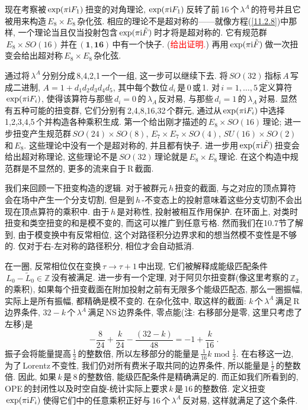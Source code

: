 现在考察被$\,\exp(\pi\mathrm{i} F_{1})\,$扭变的对角理论, $\exp(\pi\mathrm{i} F_{1})\,$反转了前\,16\,个$\,\lambda^{A}\,$的符号并且它被用来构造$\,E_{8}\times E_{8}\,$杂化弦. 相应的理论不是超对称的------就像方程(\ref{11.2.8})中那样, 一个理论当且仅当投射包含$\,\exp(\pi\mathrm{i} \tilde{F})\,$时才将是超对称的. 它有规范群$\,E_{8}\times SO(16)\,$并在$\,(\mathbf{1},\mathbf{16})\,$中有一个快子. (\textcolor{red}{给出证明.}) 再用$\,\exp(\pi\mathrm{i}\tilde{F})\,$做一次扭变会给出超对称$\,E_{8}\times E_{8}\,$杂化弦.

通过将$\,\lambda^{A}\,$分别分成\,8,4,2,1\,一个一组, 这一步可以继续下去. 将$\,SO(32)\,$指标$\,A\,$写成二进制, $A=1+d_{1}d_{2}d_{3}d_{4}d_{5}$, 其中每个数位$\,d_{i}\,$是\,0\,或\,1. 对$\,i=1,\ldots,5\,$定义算符$\,\exp(\pi\mathrm{i} F_{i})$, 使得该算符与那些$\,d_{i}=0\,$的$\,\lambda_{A}\,$反对易, 与那些$\,d_{i}=1\,$的$\,\lambda_{A}\,$对易. 显然有五种可能的扭变群, 它们分别有\,2,4,8,16,32\,个群元, 通过从$\,\exp(\pi\mathrm{i} F_{i})\,$中选择\,1,2,3,4,5\,个并构造各种乘积生成. 第一个给出刚才描述的$\,E_{8}\times SO(16)\,$理论; 进一步扭变产生规范群$\,SO(24)\times SO(8)$, $E_{7}\times E_{7}\times SO(4)$, $SU(16)\times SO(2)\,$和$\,E_{8}$. 这些理论中没有一个是超对称的, 并且都有快子. 进一步用$\,\exp(\pi\mathrm{i}\tilde{F})\,$扭变会给出超对称理论, 这些理论不是$\,SO(32)\,$理论就是$\,E_{8}\times E_{8}\,$理论. 在这个构造中规范群是不显然的, 更多的流来自于\,R\,截面.

我们来回顾一下扭变构造的逻辑. 对于被群元$\,h\,$扭变的截面, 与之对应的顶点算符会在场中产生一个分支切割, 但是到$\,h\,$-不变态上的投射意味着这些分支切割不会出现在顶点算符的乘积中. 由于$\,h\,$是对称性, 投射被相互作用保护. 在环面上, 对类时扭变和类空扭变的和是模不变的, 而这可以推广到任意亏格. 然而我们在10.7节了解到, 由于模变换中有反常相位,  这个对路径积分边界求和的想当然模不变性是不够的. 仅对于右-左对称的路径积分, 相位才会自动抵消.

在一圈, 反常相位仅在变换$\,\tau\to\tau+1\,$中出现, 它们被解释成能级匹配条件$\,L_{0}-\tilde{L}_{0}\in\mathds{Z}\,$没有被满足. 进一步有一个定理, 对于阿贝尔扭变群(像这里考察的$\,\mathds{Z}_{2}\,$的乘积), 如果每个扭变截面在附加投射之前有无限多个能级匹配态, 那么一圈振幅, 实际上是所有振幅, 都精确是模不变的. 在杂化弦中, 取这样的截面: $k\,$个$\,\lambda^{A}\,$满足\,R\,边界条件, $32-k\,$个$\,\lambda^{A}\,$满足\,NS\,边界条件, 零点能(注: 右移部分是零, 这里只考虑了左移)是
\begin{equation}
    {-}\frac{8}{24}+\frac{k}{24}-\frac{(32-k)}{48}=-1+\frac{k}{16} \:. \label{11.3.6}
\end{equation}
振子会将能量提高$\,\frac{1}{2}\,$的整数倍, 所以左移部分的能量是$\,\frac{1}{16}k\operatorname{mod}\frac{1}{2}$. 在右移这一边, 为了\,Lorentz\,不变性, 我们仍对所有费米子取共同的边界条件, 所以能量是$\,\frac{1}{2}\,$的整数倍. 因此, 如果$\,k\,$是\,$8$\,的整数倍, 能级匹配条件是精确满足的. 而正如我们所看到的, OPE\,的封闭性以及时空自旋-统计实际上要求$\,k\,$是$\,16\,$的整数倍. 定义扭变$\,\exp(\pi\mathrm{i} F_{i})\,$使得它们中的任意乘积正好与\,16\,个$\,\lambda^{A}\,$反对易, 这样就满足了这个条件.


